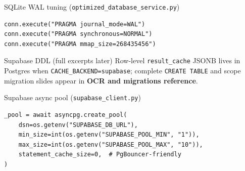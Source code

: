 \documentclass[aspectratio=169]{beamer}
\begin{document}
\begin{frame}[fragile]{SQLite WAL tuning (\texttt{optimized\_database\_service.py})}
\begin{lstlisting}[style=py]
conn.execute("PRAGMA journal_mode=WAL")
conn.execute("PRAGMA synchronous=NORMAL")
conn.execute("PRAGMA mmap_size=268435456")
\end{lstlisting}
\end{frame}

\begin{frame}{Supabase DDL (full excerpts later)}
  \small
  Row-level \texttt{result\_cache} JSONB lives in Postgres when \texttt{CACHE\_BACKEND=supabase}; complete \texttt{CREATE TABLE} and scope migration slides appear in \textbf{OCR and migrations reference}.
\end{frame}

\begin{frame}[fragile]{Supabase async pool (\texttt{supabase\_client.py})}
\begin{lstlisting}[style=py]
_pool = await asyncpg.create_pool(
    dsn=os.getenv("SUPABASE_DB_URL"),
    min_size=int(os.getenv("SUPABASE_POOL_MIN", "1")),
    max_size=int(os.getenv("SUPABASE_POOL_MAX", "10")),
    statement_cache_size=0,  # PgBouncer-friendly
)
\end{lstlisting}
\end{frame}
\end{document}
